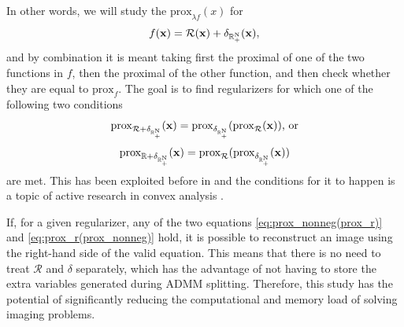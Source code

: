 In other words, we will study the $\mathrm{prox}_{\lambda f}(x)$ for
\begin{equation}
    f(\mathbf{x}) = \mathcal{R}(\mathbf{x}) + \delta_{\rm \mathbb{R}_+^N}(\mathbf{x}),
    \label{eq:scope_objective}
\end{equation}
and by combination it is meant taking first the proximal of one of the two functions in $f$, then the proximal of the other function, and then check whether they are equal to $\mathrm{prox}_f$. The goal is to find regularizers for which one of the following two conditions
\begin{equation}
    \mathrm{prox}_{\mathcal{R} + \delta_{\rm \mathbb{R}_+^N}}(\mathbf{x}) =  \mathrm{prox}_{\delta_{\rm \mathbb{R}_+^N}}(\mathrm{prox}_{\mathcal{R}}(\mathbf{x}))\mbox{, or}
    \label{eq:prox_nonneg(prox_r)}
\end{equation}
\begin{equation}
    \mathrm{prox}_{\mathbb{R} + \delta_{\rm \mathbb{R}_+^N}}(\mathbf{x}) = \mathrm{prox}_{\mathcal{R}}(\mathrm{prox}_{\delta_{\rm \mathbb{R}_+^N}}(\mathbf{x}))
    \label{eq:prox_r(prox_nonneg)}
\end{equation}
are met. This has been exploited before in \cite{del_aguila_pla_cell_2018-1, del_aguila_pla_cell_2018} and the conditions for it to happen is a topic of active research in convex analysis \cite{Adly2019}.  

If, for a given regularizer, any of the two equations \ref{eq:prox_nonneg(prox_r)} and \ref{eq:prox_r(prox_nonneg)} hold, it is possible to reconstruct an image using the right-hand side of the valid equation. This means that there is no need to treat $\mathcal{R}$ and $\delta$ separately, which has the advantage of not having to store the extra variables generated during ADMM splitting. Therefore, this study has the potential of significantly reducing the computational and memory load of solving imaging problems.


